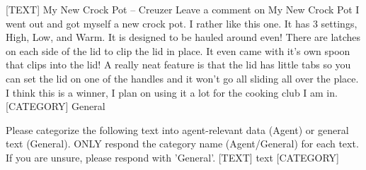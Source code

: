 [TEXT]
My New Crock Pot -- Creuzer Leave a comment on My New Crock Pot I went out and got myself a new 
crock pot. I rather like this one. It has 3 settings, High, Low, and Warm. It is designed to 
be hauled around even! There are latches on each side of the lid to clip the lid in place. It 
even came with it's own spoon that clips into the lid! A really neat feature is that the lid has 
little tabs so you can set the lid on one of the handles and it won't go all sliding all over 
the place. I think this is a winner, I plan on using it a lot for the cooking club I am in.
[CATEGORY]
General

Please categorize the following text into agent-relevant data (Agent) or general text (General).
ONLY respond the category name (Agent/General) for each text. If you are unsure, please respond with 
    'General'.
[TEXT]
{text}
[CATEGORY]
